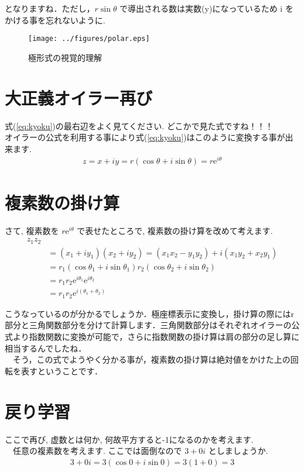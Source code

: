 \documentclass[11pt,a4paper]{ujreport}
\begin{document}
となりますね．ただし，$r\sin\theta$ で導出される数は実数(y)になっているため i をかける事を忘れないように.\\

\begin{figure}[H]
\label{im:polar}
  \centering
  \texttt{[image: ../figures/polar.eps]}
  \caption{極形式の視覚的理解}
\end{figure}

\section{大正義オイラー再び}
式(\ref{eq:kyoku})の最右辺をよく見てください. どこかで見た式ですね！！！\\
オイラーの公式を利用する事により式(\ref{eq:kyoku})はこのように変換する事が出来ます.\\
\begin{eqnarray}
z = x + iy = r(\cos\theta + i\sin \theta) = r \mathrm{e}^{i\theta}
\end{eqnarray}

\section{複素数の掛け算}
さて, 複素数を $r\mathrm{e}^{i\theta}$ で表せたところで, 複素数の掛け算を改めて考えます.\\
\begin{align}
z_1 z_2\\
& = (x_1 + iy_1)(x_2 + iy_2) = (x_1 x_2 - y_1 y_2) + i(x_1 y_2 +x_2 y_1)\\
&= r_1(\cos\theta_1 + i\sin\theta_1)r_2(\cos\theta_2 + i\sin\theta_2)\\
&= r_1r_2\mathrm{e}^{i\theta_1} \mathrm{e}^{i\theta_2}\\
&= r_1r_2\mathrm{e}^{i(\theta_1 + \theta_2)}
\end{align}

こうなっているのが分かるでしょうか．極座標表示に変換し，掛け算の際にはr部分と三角関数部分を分けて計算します．三角関数部分はそれぞれオイラーの公式より指数関数に変換が可能で，さらに指数関数の掛け算は肩の部分の足し算に相当するんでしたね．\\
　そう，この式でようやく分かる事が，複素数の掛け算は絶対値をかけた上の回転を表すということです．
\section{戻り学習}
ここで再び, 虚数とは何か, 何故平方すると-1になるのかを考えます.\\
　任意の複素数を考えます. ここでは面倒なので $ 3 + 0i$ としましょうか.
\begin{eqnarray}
3 + 0i = 3(\cos 0 + i\sin 0) = 3(1 + 0) = 3
\end{eqnarray}
\end{document}
